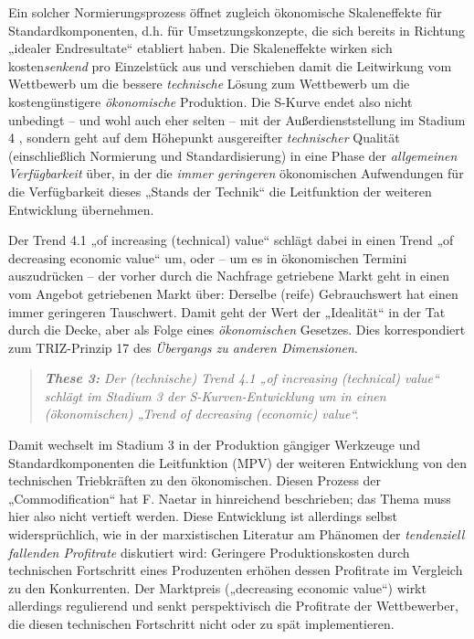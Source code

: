 \documentclass[11pt,a4paper]{article}
\begin{document}
Ein solcher Normierungsprozess öffnet zugleich ökonomische Skaleneffekte für
Standardkomponenten, d.h. für Umsetzungskonzepte, die sich bereits in Richtung
„idealer Endresultate“ etabliert haben. Die Skaleneffekte wirken sich
kosten\emph{senkend} pro Einzelstück aus und verschieben damit die Leitwirkung
vom Wettbewerb um die bessere \emph{technische} Lösung zum Wettbewerb um die
kostengünstigere \emph{ökonomische} Produktion.  Die S-Kurve endet also nicht
unbedingt -- und wohl auch eher selten -- mit der Außerdienststellung im
Stadium 4 \cite[S. 38]{TESE2018}, sondern geht auf dem Höhepunkt ausgereifter
\emph{technischer} Qualität (einschließlich Normierung und Standardisierung)
in eine Phase der \emph{allgemeinen Verfügbarkeit} über, in der die
\emph{immer geringeren} ökonomischen Aufwendungen für die Verfügbarkeit dieses
„Stands der Technik“ die Leitfunktion der weiteren Entwicklung übernehmen.

Der Trend 4.1 „of increasing (technical) value“ schlägt dabei in einen Trend
„of decreasing economic value“ um, oder -- um es in ökonomischen Termini
auszudrücken -- der vorher durch die Nachfrage getriebene Markt geht in einen
vom Angebot getriebenen Markt über: Derselbe (reife) Gebrauchswert hat einen
immer geringeren Tauschwert.  Damit geht der Wert der „Idealität“
\cite[Kap. 4.1.1]{KS2017} in der Tat durch die Decke, aber als Folge eines
\emph{ökonomischen} Gesetzes.  Dies korrespondiert zum TRIZ-Prinzip 17 des
\emph{Übergangs zu anderen Dimensionen}.
\begin{quote}\it
  \textbf{These 3:} Der (technische) Trend 4.1 „of increasing (technical)
  value“ schlägt im Stadium 3 der S-Kurven-Entwicklung um in einen
  (ökonomischen) „Trend of decreasing (economic) value“.
\end{quote}
Damit wechselt im Stadium 3 in der Produktion gängiger Werkzeuge und
Standardkomponenten die Leitfunktion (MPV) der weiteren Entwicklung von den
technischen Triebkräften zu den ökonomischen. Diesen Prozess der
„Commodification“ hat F. Naetar in \cite{Naetar2005} hinreichend beschrieben;
das Thema muss hier also nicht vertieft werden. Diese Entwicklung ist
allerdings selbst widersprüchlich, wie in der marxistischen Literatur am
Phänomen der \emph{tendenziell fallenden Profitrate} diskutiert wird:
Geringere Produktionskosten durch technischen Fortschritt eines Produzenten
erhöhen dessen Profitrate im Vergleich zu den Konkurrenten. Der Marktpreis
(„decreasing economic value“) wirkt allerdings regulierend und senkt
perspektivisch die Profitrate der Wettbewerber, die diesen technischen
Fortschritt nicht oder zu spät implementieren.
\end{document}
